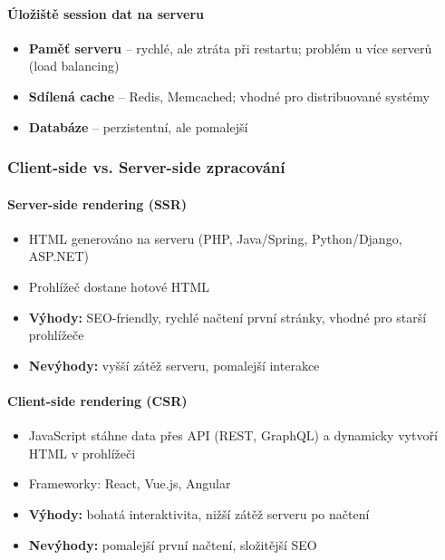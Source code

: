 \paragraph{Úložiště session dat na serveru}
\begin{itemize}
  \item \textbf{Paměť serveru} -- rychlé, ale ztráta při restartu; problém u více serverů (load balancing)
  \item \textbf{Sdílená cache} -- Redis, Memcached; vhodné pro distribuované systémy
  \item \textbf{Databáze} -- perzistentní, ale pomalejší
\end{itemize}

\subsubsection{Client-side vs. Server-side zpracování}

\paragraph{Server-side rendering (SSR)}
\begin{itemize}
  \item HTML generováno na serveru (PHP, Java/Spring, Python/Django, ASP.NET)
  \item Prohlížeč dostane hotové HTML
  \item \textbf{Výhody:} SEO-friendly, rychlé načtení první stránky, vhodné pro starší prohlížeče
  \item \textbf{Nevýhody:} vyšší zátěž serveru, pomalejší interakce
\end{itemize}

\paragraph{Client-side rendering (CSR)}
\begin{itemize}
  \item JavaScript stáhne data přes API (REST, GraphQL) a dynamicky vytvoří HTML v prohlížeči
  \item Frameworky: React, Vue.js, Angular
  \item \textbf{Výhody:} bohatá interaktivita, nižší zátěž serveru po načtení
  \item \textbf{Nevýhody:} pomalejší první načtení, složitější SEO
\end{itemize}

